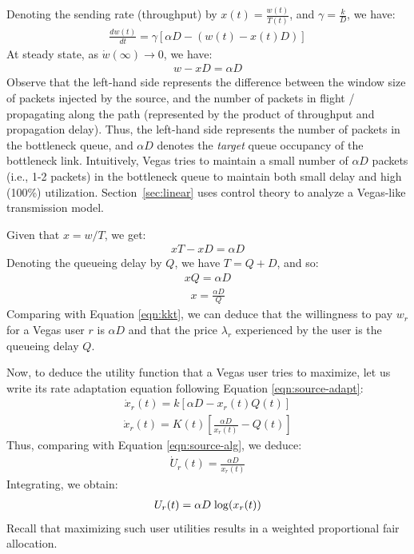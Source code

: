 \documentclass{article}
\def\lg{{\rm log}}
\begin{document}
Denoting the sending rate (throughput) by $x(t) = \frac{w(t)}{T(t)}$, 
and $\gamma = \frac{k}{D}$, we have:
\begin{eqnarray*}
\frac{dw(t)}{dt} = \gamma [\alpha D - (w(t) - x(t)D)]
\end{eqnarray*}
At steady state, as $\dot{w}(\infty) \rightarrow 0$, we have:
\begin{eqnarray*}
w - x D = \alpha D
\end{eqnarray*}
Observe that the left-hand side represents the difference between the window size of packets
injected by the source, and the number of packets in flight / propagating along the path (represented by
the product of throughput and propagation delay). Thus,
the left-hand side represents the number of packets in the bottleneck queue,
and $\alpha D$ denotes the {\em target} queue occupancy of the bottleneck link.
Intuitively, Vegas tries to maintain a small number of $\alpha D$ packets
(i.e., 1-2 packets)
in the bottleneck queue to maintain both small delay and high (100\%) utilization.
Section~\ref{sec:linear} uses control theory to analyze a Vegas-like transmission model.

Given that $x = w/T$, we get:
\begin{eqnarray*}
x T - x D = \alpha D
\end{eqnarray*}
Denoting the queueing delay by $Q$, we have $T = Q + D$, and so: 
\begin{eqnarray*}
x Q = \alpha D
\end{eqnarray*}
\begin{eqnarray*}
x = \frac{\alpha D}{Q}
\end{eqnarray*}
Comparing with Equation \ref{eqn:kkt}, we can deduce that
the willingness to pay $w_r$ for a Vegas user $r$ is $\alpha D$
and that the price $\lambda_r$ experienced by the user is the queueing delay $Q$.

Now, to deduce the utility function that a Vegas user tries to maximize,
let us write its rate adaptation equation following Equation \ref{eqn:source-adapt}:
\begin{eqnarray*}
\dot{x}_r(t) = k [\alpha D - x_r(t) Q(t)]
\end{eqnarray*}
\begin{eqnarray*}
\dot{x}_r(t) = K(t) [\frac{\alpha D}{x_r(t)} - Q(t)]
\end{eqnarray*}
Thus, comparing with Equation \ref{eqn:source-alg}, we deduce:
\begin{eqnarray*}
\dot{U}_r(t) = \frac{\alpha D}{x_r(t)} 
\end{eqnarray*}
Integrating, we obtain:
\begin{eqnarray*}
U_r(t) = \alpha D \; \lg(x_r(t)) 
\end{eqnarray*}
Recall that maximizing such user utilities results in a weighted proportional fair allocation.
\end{document}
